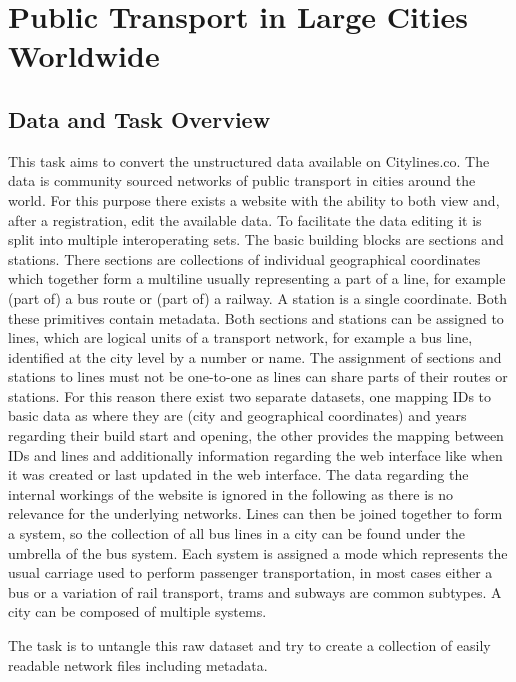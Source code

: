 \chapter[Task 41]{Public Transport in Large Cities Worldwide}



\section{Data and Task Overview}
 This task aims to convert the unstructured data available on Citylines.co\cite{citylines}. The data is community sourced networks of public transport in cities around the world. For this purpose there exists a website with the ability to both view and, after a registration, edit the available data. To facilitate the data editing it is split into multiple interoperating sets. The basic building blocks are sections and stations. There sections are collections of individual geographical coordinates which together form a multiline usually representing a part of a line, for example (part of) a bus route or (part of) a railway. A station is a single coordinate. Both these primitives contain metadata. Both sections and stations can be assigned to lines, which are logical units of a transport network, for example a bus line, identified at the city level by a number or name. The assignment of sections and stations to lines must not be one-to-one as lines can share parts of their routes or stations. For this reason there exist two separate datasets, one mapping IDs to basic data as where they are (city and geographical coordinates) and years regarding their build start and opening, the other provides the mapping between IDs and lines and additionally information regarding the web interface like when it was created or last updated in the web interface. The data regarding the internal workings of the website is ignored in the following as there is no relevance for the underlying networks. Lines can then be joined together to form a system, so the collection of all bus lines in a city can be found under the umbrella of the bus system. Each system is assigned a mode which represents the usual carriage used to perform passenger transportation, in most cases either a bus or a variation of rail transport, trams and subways are common subtypes. A city can be composed of multiple systems.
 
 The task is to untangle this raw dataset and try to create a collection of easily readable network files including metadata.


